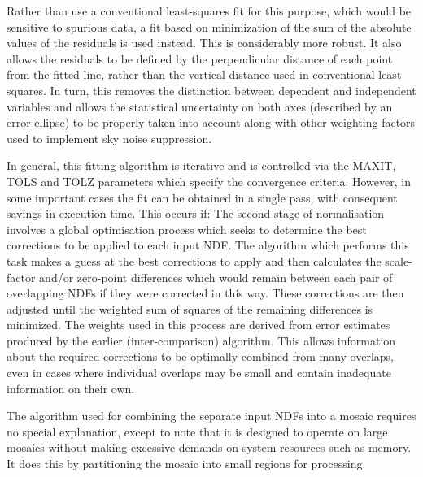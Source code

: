 {{      Rather than use a conventional least-squares fit for this
      purpose, which would be sensitive to spurious data, a fit based
      on minimization of the sum of the absolute values of the
      residuals is used instead. This is considerably more robust. It
      also allows the residuals to be defined by the perpendicular
      distance of each point from the fitted line, rather than the
      vertical distance used in conventional least squares. In turn,
      this removes the distinction between dependent and independent
      variables and allows the statistical uncertainty on both axes
      (described by an error ellipse) to be properly taken into account
      along with other weighting factors used to implement sky noise
      suppression.

      In general, this fitting algorithm is iterative and is controlled
      via the MAXIT, TOLS and TOLZ parameters which specify the
      convergence criteria. However, in some important cases the fit
      can be obtained in a single pass, with consequent savings in
      execution time. This occurs if:
      The second stage of normalisation involves a global optimisation
      process which seeks to determine the best corrections to be
      applied to each input NDF. The algorithm which performs this task
      makes a guess at the best corrections to apply and then
      calculates the scale-factor and/or zero-point differences which
      would remain between each pair of overlapping NDFs if they were
      corrected in this way. These corrections are then adjusted until
      the weighted sum of squares of the remaining differences is
      minimized. The weights used in this process are derived from
      error estimates produced by the earlier (inter-comparison)
      algorithm. This allows information about the required corrections
      to be optimally combined from many overlaps, even in cases where
      individual overlaps may be small and contain inadequate
      information on their own.

      The algorithm used for combining the separate input NDFs into a
      mosaic requires no special explanation, except to note that it is
      designed to operate on large mosaics without making excessive
      demands on system resources such as memory. It does this by
      partitioning the mosaic into small regions for processing.
   }
   }
